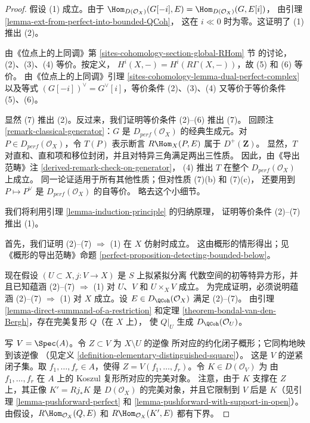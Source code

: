 \begin{proof}
假设 (1) 成立。由于
$\Hom_{D(\mathcal{O}_X)}(G[-i], E) = \Hom_{D(\mathcal{O}_X)}(G, E[i])$，
由引理 \ref{lemma-ext-from-perfect-into-bounded-QCoh}，
这在 $i \ll 0$ 时为零。这证明了 (1) 推出 (2)。

\medskip\noindent
由《位点上的上同调》第 \ref{sites-cohomology-section-global-RHom} 节
的讨论，(2)、(3)、(4) 等价。按定义，
$H^i(X, -) = H^i(R\Gamma(X, -))$，故 (5) 和 (6) 等价。
由《位点上的上同调》引理
\ref{sites-cohomology-lemma-dual-perfect-complex} 以及等式
$(G[-i])^\vee = G^\vee[i]$，等价条件 (2)、(3)、(4)
又等价于等价条件 (5)、(6)。

\medskip\noindent
显然 (7) 推出 (2)。反过来，我们证明等价条件 (2)--(6) 推出 (7)。
回顾注 \ref{remark-classical-generator}：$G$ 是
$D_{perf}(\mathcal{O}_X)$ 的经典生成元。对
$P \in D_{perf}(\mathcal{O}_X)$，令 $T(P)$ 表示断言
$R\Hom_X(P, E)$ 属于 $D^+(\mathbf{Z})$。
显然，$T$ 对直和、直和项和移位封闭，并且对特异三角满足两出三性质。
因此，由《导出范畴》注 \ref{derived-remark-check-on-generator}，
(4) 推出 $T$ 在整个 $D_{perf}(\mathcal{O}_X)$ 上成立。
同一论证适用于所有其他性质；但对性质 (7)(b) 和 (7)(c)，%
还要用到 $P \mapsto P^\vee$ 是 $D_{perf}(\mathcal{O}_X)$ 的自等价。
略去这个小细节。

\medskip\noindent
我们将利用引理 \ref{lemma-induction-principle} 的归纳原理，
证明等价条件 (2)--(7) 推出 (1)。

\medskip\noindent
首先，我们证明 (2)--(7) $\Rightarrow$ (1) 在 $X$ 仿射时成立。
这由概形的情形得出；见《概形的导出范畴》命题
\ref{perfect-proposition-detecting-bounded-below}。

\medskip\noindent
现在假设 $(U \subset X, j : V \to X)$ 是 $S$ 上拟紧拟分离
代数空间的初等特异方形，并且已知蕴涵 (2)--(7) $\Rightarrow$ (1)
对 $U$、$V$ 和 $U \times_X V$ 成立。
为完成证明，必须说明蕴涵 (2)--(7) $\Rightarrow$ (1) 对 $X$ 成立。设
$E \in D_\QCoh(\mathcal{O}_X)$ 满足 (2)--(7)。
由引理 \ref{lemma-direct-summand-of-a-restriction} 和定理
\ref{theorem-bondal-van-den-Bergh}，存在完美复形 $Q$（在 $X$ 上），
使 $Q|_U$ 生成 $D_\QCoh (\mathcal{O}_U)$。

\medskip\noindent
写 $V = \Spec(A)$。令 $Z \subset V$ 为 $X \setminus U$ 的逆像
所对应的约化闭子概形；它同构地映到该逆像
（见定义 \ref{definition-elementary-distinguished-square}）。
这是 $V$ 的逆紧闭子集。取 $f_1, \ldots, f_r \in A$，使得
$Z = V(f_1, \ldots, f_r)$。令 $K \in D(\mathcal{O}_V)$ 为
由 $f_1, \ldots, f_r$ 在 $A$ 上的 Koszul 复形所对应的完美对象。
注意，由于 $K$ 支撑在 $Z$ 上，其正像
$K' = Rj_*K$ 是 $D(\mathcal{O}_X)$ 的完美对象，并且它限制到
$V$ 后是 $K$（见引理 \ref{lemma-pushforward-perfect} 和
\ref{lemma-pushforward-with-support-in-open}）。
由假设，$R\Hom_{\mathcal{O}_X}(Q, E)$ 和
$R\Hom_{\mathcal{O}_X}(K', E)$ 都有下界。


\end{proof}
